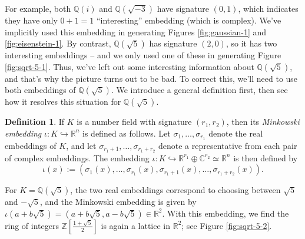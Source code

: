 \documentclass[12pt]{amsart}
\theoremstyle{definition} \newtheorem*{notation}{Notation}
\theoremstyle{remark} \newtheorem*{remark}{Remark}
\theoremstyle{remark} \newtheorem*{example}{Example}
\theoremstyle{definition} \newtheorem*{definition}{Definition}
\numberwithin{equation}{section}
\numberwithin{theorem}{section}
\begin{document}
	For example, both $\mathbb{Q}(i)$ and $\mathbb{Q}(\sqrt{-3})$ have signature $(0,1)$, which indicates they have only $0+1=1$ ``interesting'' embedding (which is complex).  We've implicitly used this embedding in generating Figures \ref{fig:gaussian-1} and \ref{fig:eisenstein-1}.  By contrast, $\mathbb{Q}(\sqrt{5})$ has signature $(2,0)$, so it has two interesting embeddings -- and we only used one of these in generating Figure \ref{fig:sqrt-5-1}.  Thus, we've left out some interesting information about $\mathbb{Q}(\sqrt{5})$, and that's why the picture turns out to be bad.  To correct this, we'll need to use both embeddings of $\mathbb{Q}(\sqrt{5})$.  We introduce a general definition first, then see how it resolves this situation for $\mathbb{Q}(\sqrt{5})$.
	
	\begin{definition}
		If $K$ is a number field with signature $(r_1,r_2)$, then its \emph{Minkowski embedding} $\iota\colon K \hookrightarrow \mathbb{R}^n$ is defined as follows.  Let $\sigma_1,\dots,\sigma_{r_1}$ denote the real embeddings of $K$, and let $\sigma_{r_1+1},\dots,\sigma_{r_1+r_2}$ denote a representative from each pair of complex embeddings.  The embedding $\iota\colon K \hookrightarrow \mathbb{R}^{r_1} \oplus \mathbb{C}^{r_2} \simeq \mathbb{R}^n$ is then defined by
			\[
				\iota(x) := (\sigma_1(x),\dots,\sigma_{r_1}(x),\sigma_{r_1+1}(x),\dots,\sigma_{r_1+r_2}(x)).
			\]
	\end{definition}
	
	For $K=\mathbb{Q}(\sqrt{5})$, the two real embeddings correspond to choosing between $\sqrt{5}$ and $-\sqrt{5}$, and the Minkowski embedding is given by $\iota(a+b\sqrt{5}) = (a + b\sqrt{5}, a-b\sqrt{5}) \in \mathbb{R}^2$.  With this embedding, we find the ring of integers $\mathbb{Z}[\frac{1+\sqrt{5}}{2}]$ is again a lattice in $\mathbb{R}^2$; see Figure \ref{fig:sqrt-5-2}.
	
\end{document}
